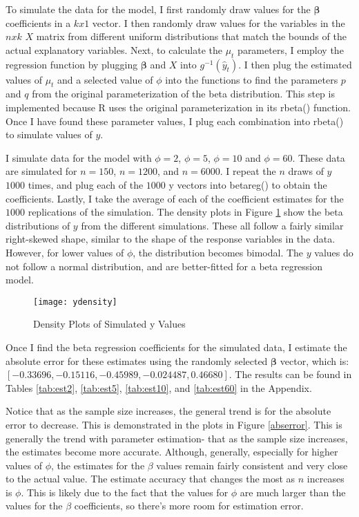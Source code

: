 \documentclass{svproc}
\begin{document}
To simulate the data for the model, I first randomly draw values for the $\bm{\beta}$ coefficients in a $kx1$ vector. I then randomly draw values for the variables in the $nxk$ $X$ matrix from different uniform distributions that match the bounds of the actual explanatory variables. Next, to calculate the $\mu_t$ parameters, I employ the regression function by plugging $\bm{\beta}$ and $X$ into $g^{-1}(\hat{y}_t)$. I then plug the estimated values of $\mu_t$ and a selected value of $\phi$ into the functions to find the parameters $p$ and $q$ from the original parameterization of the beta distribution. This step is implemented because R uses the original parameterization in its rbeta() function. Once I have found these parameter values, I plug each combination into rbeta() to simulate values of $y$. 

I simulate data for the model with $\phi = 2$, $\phi = 5$, $\phi = 10$ and $\phi = 60$. These data are simulated for $n = 150$, $n = 1200$, and $n=6000$. I repeat the $n$ draws of $y$ $1000$ times, and plug each of the $1000$ y vectors into betareg() to obtain the coefficients. Lastly, I take the average of each of the coefficient estimates for the $1000$ replications of the simulation. The density plots in Figure \ref{ydensity} show the beta distributions of $y$ from the different simulations. These all follow a fairly similar right-skewed shape, similar to the shape of the response variables in the data. However, for lower values of $\phi$, the distribution becomes bimodal. The $y$ values do not follow a normal distribution, and are better-fitted for a beta regression model.

\begin{figure}
\begin{center}
\caption{Density Plots of Simulated y Values}
\texttt{[image: ydensity]}
\label{ydensity}
\smallskip
\end{center}
\end{figure}

Once I find the beta regression coefficients for the simulated data, I estimate the absolute error for these estimates using the randomly selected $\bm{\beta}$ vector, which is: $[-0.33696,-0.15116, -0.45989, -0.024487, 0.46680]$. The results can be found in Tables \ref{tab:est2}, \ref{tab:est5}, \ref{tab:est10}, and \ref{tab:est60} in the Appendix. 

Notice that as the sample size increases, the general trend is for the absolute error to decrease. This is demonstrated in the plots in Figure \ref{abserror}. This is generally the trend with parameter estimation- that as the sample size increases, the estimates become more accurate. Although, generally, especially for higher values of $\phi$, the estimates for the $\beta$ values remain fairly consistent and very close to the actual value. The estimate accuracy that changes the most as $n$ increases is $\phi$. This is likely due to the fact that the values for $\phi$ are much larger than the values for the $\beta$ coefficients, so there's more room for estimation error.
\end{document}
